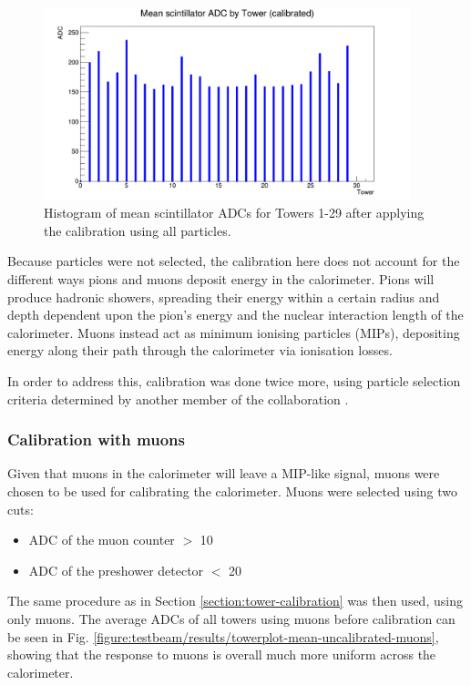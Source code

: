 \begin{figure}[hp]
	\centering
	\includegraphics[width=0.95\textwidth]{../Pictures/IDEA/Calibration/new-towerplot-all-cal.png}
	\caption{Histogram of mean scintillator \acrshort{ADC}s for Towers 1-29 after applying the calibration using all particles.}
	\label{figure:testbeam/results/towerplot-mean-calibrated-all}
\end{figure}

Because particles were not selected, the calibration here does not account for the different ways pions and muons deposit energy in the calorimeter. Pions will produce hadronic showers, spreading their energy within a certain radius and depth dependent upon the pion's energy and the nuclear interaction length of the calorimeter. Muons instead act as minimum ionising particles (\acrshort{MIP}s), depositing energy along their path through the calorimeter via ionisation losses.

In order to address this, calibration was done twice more, using particle selection criteria determined by another member of the collaboration \cite{idea-particle-selection}.

\subsubsection{Calibration with muons}
Given that muons in the calorimeter will leave a \acrshort{MIP}-like signal, muons were chosen to be used for calibrating the calorimeter. Muons were selected using two cuts: 

\begin{itemize}
	\item ADC of the muon counter $>$ 10
	\item ADC of the preshower detector $<$ 20
\end{itemize}

The same procedure as in Section \ref{section:tower-calibration} was then used, using only muons. The average ADCs of all towers using muons before calibration can be seen in Fig. \ref{figure:testbeam/results/towerplot-mean-uncalibrated-muons}, showing that the response to muons is overall much more uniform across the calorimeter.

